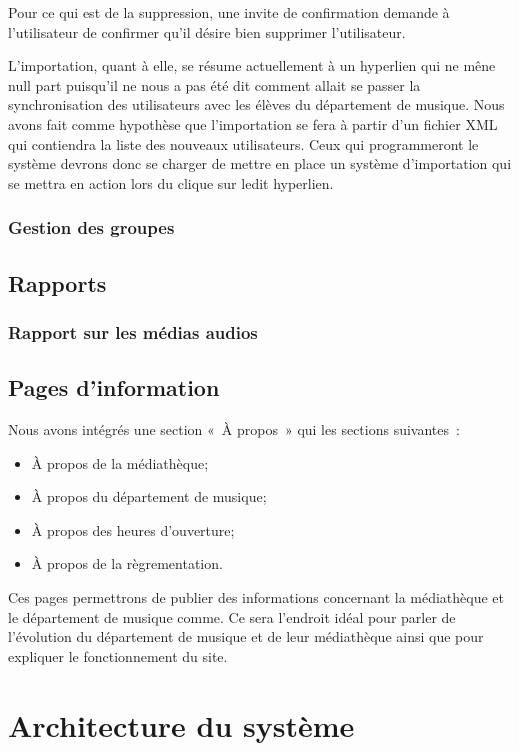 \documentclass[letter, 11pt]{report}
\begin{document}
Pour ce qui est de la suppression, une invite de confirmation demande à l'utilisateur de confirmer qu'il désire bien supprimer l'utilisateur.

L'importation, quant à elle, se résume actuellement à un hyperlien qui ne mêne null part puisqu'il ne nous a pas été dit comment allait se passer la synchronisation des utilisateurs avec les élèves du département de musique. Nous avons fait comme hypothèse que l'importation se fera à partir d'un fichier XML qui contiendra la liste des nouveaux utilisateurs. Ceux qui programmeront le système devrons donc se charger de mettre en place un système d'importation qui se mettra en action lors du clique sur ledit hyperlien.

\subsection{Gestion des groupes}

\section{Rapports}

\subsection{Rapport sur les médias audios}

\section{Pages d'information}

Nous avons intégrés une section «~À propos~» qui les sections suivantes~:
\begin{itemize}
	\item À propos de la médiathèque;
	\item À propos du département de musique;
	\item À propos des heures d'ouverture;
	\item À propos de la règrementation.
\end{itemize}

Ces pages permettrons de publier des informations concernant la médiathèque et le département de musique comme. Ce sera l'endroit idéal pour parler de l'évolution du département de musique et de leur médiathèque ainsi que pour expliquer le fonctionnement du site.

\chapter{Architecture du système}
\end{document}
